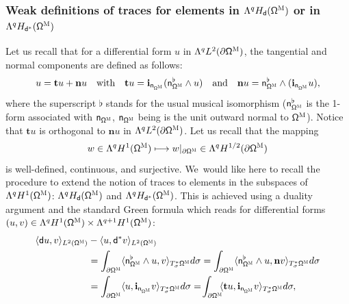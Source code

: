 \documentclass[10pt]{amsart}
\newcommand\mto{\mathchoice{\longmapsto}{\mapsto}{\mapsto}{\mapsto}}
\newcommand{\mbf}[1]{\mathbf{#1}}
\let\pa\partial
\theoremstyle{plain}
\theoremstyle{definition}
\begin{document}
\subsubsection*{Weak definitions of traces for elements in $\Lambda^q H_{\mathsf d} (\mathsf \Omega^{\textsc{M}})$ or in $\Lambda^q H_{\mathsf d^*} (\mathsf \Omega^{\textsc{M}})$}
Let us recall that for a differential form $u$ in $\Lambda^qL^2 (\pa\mathsf \Omega^{\textsc{M}})$, the tangential and normal components are defined as follows:
\begin{equation}
\label{eq.decomp-bdy}
u= \mathbf t u+\mathbf n u\quad\text{with}\quad
\mathbf t u= \mathbf{i}_{\mathsf n_{\mathsf \Omega^{\textsc{M}}}}(\mathsf n_{\mathsf \Omega^{\textsc{M}}}^{\flat} \wedge u)\quad\text{and}\quad
\mathbf n u= \mathsf n_{\mathsf \Omega^{\textsc{M}}}^{\flat}\wedge(\mathbf{i}_{\mathsf n_{\mathsf \Omega^{\textsc{M}}}} u),
\end{equation}
where the superscript $\flat$ stands for the usual musical
isomorphism ($\mathsf n_{\mathsf \Omega^{\textsc{M}}}^\flat$ is the 1-form associated with $\mathsf n_{\mathsf \Omega^{\textsc{M}}}$, $\mathsf n_{\mathsf \Omega^{\textsc{M}}}$ being is the unit outward normal to $\mathsf \Omega^{\textsc{M}}$). Notice that $\mathbf t u$ is orthogonal to $\mbf n u$ in $\Lambda^qL^2 (\pa\mathsf \Omega^{\textsc{M}})$. Let us
recall that the mapping
\begin{equation}
\label{eq.trace-usual}
w\in \Lambda^qH^1(\mathsf \Omega^{\textsc{M}})\mto w|_{\pa \mathsf \Omega^{\textsc{M}}}\in \Lambda^qH^{1/2} (\pa\mathsf \Omega^{\textsc{M}})
\end{equation}
is well-defined, continuous, and surjective. We~would like here to
recall the procedure to extend the notion of traces to elements in
the subspaces of $\Lambda^qH^1(\mathsf \Omega^{\textsc{M}})$: $\Lambda^q H_{\mathsf d} (\mathsf \Omega^{\textsc{M}})$ and $\Lambda^q H_{\mathsf d^*} (\mathsf \Omega^{\textsc{M}})$. This is achieved using a duality argument and the standard Green formula which reads for differential forms $(u,v)\in \Lambda^{q}H^1 (\mathsf \Omega^{\textsc{M}}) \times \Lambda^{q
+1}H^1 (\mathsf \Omega^{\textsc{M}})$:
\begin{align}
\label{eq:usual_Green}
\langle \mathsf du, v\rangle_{ L^2 (\mathsf \Omega^{\textsc{M}})}&-
\langle u, \mathsf d^*v\rangle_{ L^2 (\mathsf \Omega^{\textsc{M}})}\\
\nonumber&= \int_{\partial \mathsf \Omega^{\textsc{M}}} \langle \mathsf n_{\mathsf \Omega^{\textsc{M}}}^\flat \wedge u,v\rangle_{ T^*_{\sigma}\mathsf \Omega^{\textsc{M}}} d\sigma= \int_{\partial \mathsf \Omega^{\textsc{M}}} \langle \mathsf n_{\mathsf \Omega^{\textsc{M}}}^\flat \wedge u, \mathbf n v\rangle_{ T^*_{\sigma}\mathsf \Omega^{\textsc{M}}} d\sigma\\
&=\int_{\partial \mathsf \Omega^{\textsc{M}}} \langle u,\mathbf{i}_{\mathsf n_{\mathsf \Omega^{\textsc{M}}}} v\rangle_{ T^*_{\sigma}\mathsf \Omega^{\textsc{M}}} d\sigma=\! \int_{\partial \mathsf \Omega^{\textsc{M}}} \!\! \langle \mathbf t u,\mathbf{i}_{\mathsf n_{\mathsf \Omega^{\textsc{M}}}} v\rangle_{ T^*_{\sigma}\mathsf \Omega^{\textsc{M}}} d\sigma,\notag
\end{align}
\end{document}
